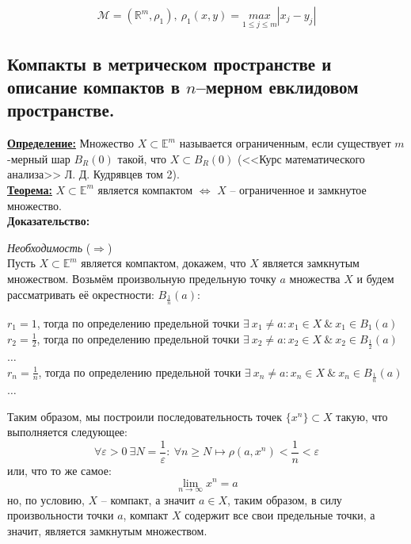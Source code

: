 \documentclass[a4paper,12pt]{article} %
\begin{document}
	\begin{equation*}
		\mathscr{M} = (\mathbb{R}^m, \rho_{1}), ~ \rho_{1}(x, y) = \underset{1 \leqslant j \leqslant m}{max} |x_j - y_j|
	\end{equation*}
	
	\subsection{Компакты в метрическом пространстве и описание компактов в $n$–мерном евклидовом пространстве.}
	
	\underline{\textbf{Определение:}} Множество $X \subset \mathbb{E}^m$ называется ограниченным, если существует $m$-мерный шар $B_{R}(0)$ такой, что $X \subset B_{R}(0)$ (<<Курс математического анализа>> Л. Д. Кудрявцев том 2).\\
	
	\underline{\textbf{Теорема:}} $X \subset \mathbb{E}^m$ является компактом $\Leftrightarrow$ $X$ -- ограниченное и замкнутое множество.\\
	
	\textbf{Доказательство:}
	
	\textit{Необходимость} ($\Rightarrow$)\\
	
	Пусть $X \subset \mathbb{E}^m$ является компактом, докажем, что $X$ является замкнутым множеством. Возьмём произвольную предельную точку $a$ множества $X$ и будем рассматривать её окрестности: $B_{\frac{1}{n}}(a)$:
	\begin{center}
		$r_1 = 1$, тогда по определению предельной точки $\exists ~ x_1 \neq a : x_1 \in X ~ \& ~ x_1 \in B_{1}(a)$\\
		$r_2 = \frac{1}{2}$, тогда по определению предельной точки $\exists ~ x_2 \neq a : x_2 \in X ~ \& ~ x_2 \in B_{\frac{1}{2}}(a)$\\
		$\dots$\\
		$r_n = \frac{1}{n}$, тогда по определению предельной точки $\exists ~ x_n \neq a : x_n \in X ~ \& ~ x_n \in B_{\frac{1}{n}}(a)$\\
		$\dots$\\
	\end{center}
	
	Таким образом, мы построили последовательность точек $\{x^n \} \subset X$ такую, что выполняется следующее:
	\[ \forall \varepsilon > 0 ~ \exists N = \frac{1}{\varepsilon} : ~ \forall n \geqslant N \mapsto \rho(a, x^n) < \frac{1}{n} < \varepsilon \]
	или, что то же самое:
	\[\lim\limits_{n \to \infty} x^n = a \]
	но, по условию, $X$ -- компакт, а значит $a \in X$, таким образом, в силу произвольности точки $a$, компакт $X$ содержит все свои предельные точки, а значит, является замкнутым множеством.\\
	
\end{document}
